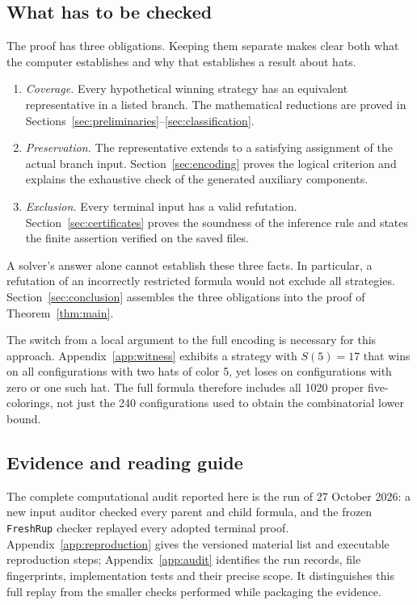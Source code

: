 \subsection{What has to be checked}
The proof has three obligations. Keeping them separate makes clear both
what the computer establishes and why that establishes a result about hats.
\begin{enumerate}
\item \emph{Coverage.} Every hypothetical winning strategy has an
 equivalent representative in a listed branch. The mathematical
 reductions are proved in Sections~\ref{sec:preliminaries}--\ref{sec:classification}.
\item \emph{Preservation.} The representative extends to a satisfying
 assignment of the actual branch input. Section~\ref{sec:encoding}
 proves the logical criterion and explains the exhaustive check of the
 generated auxiliary components.
\item \emph{Exclusion.} Every terminal input has a valid refutation.
 Section~\ref{sec:certificates} proves the soundness of the inference
 rule and states the finite assertion verified on the saved files.
\end{enumerate}
A solver's answer alone cannot establish these three facts. In particular,
a refutation of an incorrectly restricted formula would not exclude all
strategies. Section~\ref{sec:conclusion} assembles the three obligations
into the proof of Theorem~\ref{thm:main}.

The switch from a local argument to the full encoding is necessary for
this approach. Appendix~\ref{app:witness} exhibits a strategy with
$S(5)=17$ that wins on all configurations with two hats of color 5, yet
loses on configurations with zero or one such hat. The full formula
therefore includes all 1020 proper five-colorings, not just the
240 configurations used to obtain the combinatorial lower bound.

\subsection{Evidence and reading guide}
The complete computational audit reported here is the run of
27 October 2026: a new input auditor checked every parent and child
formula, and the frozen \texttt{FreshRup} checker replayed every adopted
terminal proof. Appendix~\ref{app:reproduction} gives the versioned
material list and executable reproduction steps;
Appendix~\ref{app:audit} identifies the run records, file fingerprints,
implementation tests and their precise scope. It distinguishes this
full replay from the smaller checks performed while packaging the evidence.

